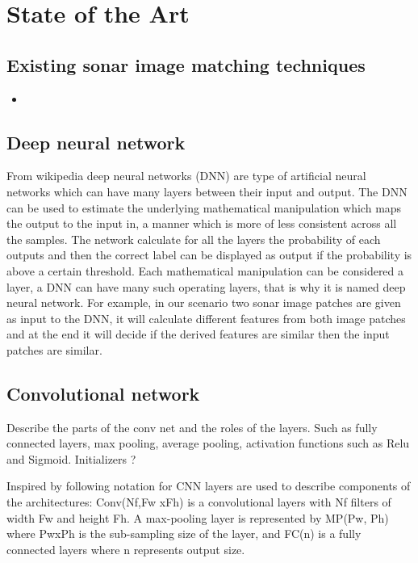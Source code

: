 
\chapter{State of the Art}

\section{Existing sonar image matching techniques}
\begin{itemize}
 \item 
\end{itemize}


\section{Deep neural network}
From wikipedia \cite{wikidnn} deep neural networks (DNN) are type of artificial neural networks which can have many layers between their input and output. The DNN can be used to estimate the underlying mathematical manipulation
which maps the output to the input in, a manner which is more of less consistent across all the samples. The network calculate for all the layers the probability of each outputs and then the correct label can be displayed as output 
if the probability is above a certain threshold. Each mathematical manipulation can be considered a layer, a DNN can have many such operating layers, that is why it is named deep neural network. For example, in our scenario two sonar 
image patches are given as input to the DNN, it will calculate different features from both image patches and at the end it will decide if the derived features are similar then the input patches are similar.

\section{Convolutional network}
\cite{wikicnn} 
Describe the parts of the conv net and the roles of the layers. Such as fully connected layers, max pooling, average pooling, activation functions such as Relu and Sigmoid. Initializers ?

Inspired by  \cite{stateoftheart} following notation for CNN layers are used to describe components of the architectures: Conv(Nf,Fw xFh) is a convolutional layers with Nf filters of width Fw and height Fh.
A max-pooling layer is represented by MP(Pw, Ph) where PwxPh is the sub-sampling size of the layer, and FC(n) is a fully connected layers where n represents output size.

